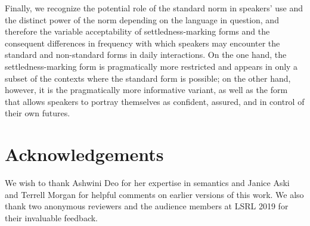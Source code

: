\documentclass[output=paper,colorlinks,citecolor=brown]{langscibook}
\begin{document}
Finally, we recognize the potential role of the standard norm in speakers’ use and the distinct power of the norm depending on the language in question, and therefore the variable acceptability of settledness-marking forms and the consequent differences in frequency with which speakers may encounter the standard and non-standard forms in daily interactions. On the one hand, the settledness-marking form is pragmatically more restricted and appears in only a subset of the contexts where the standard form is possible; on the other hand, however, it is the pragmatically more informative variant, as well as the form that allows speakers to portray themselves as confident, assured, and in control of their own futures. 



\section*{Acknowledgements}
We wish to thank Ashwini Deo for her expertise in semantics and Janice Aski and Terrell Morgan for helpful comments on earlier versions of this work. We also thank two anonymous reviewers and the audience members at LSRL 2019 for their invaluable feedback.

\printbibliography[heading=subbibliography,notkeyword=this]
\end{document}
